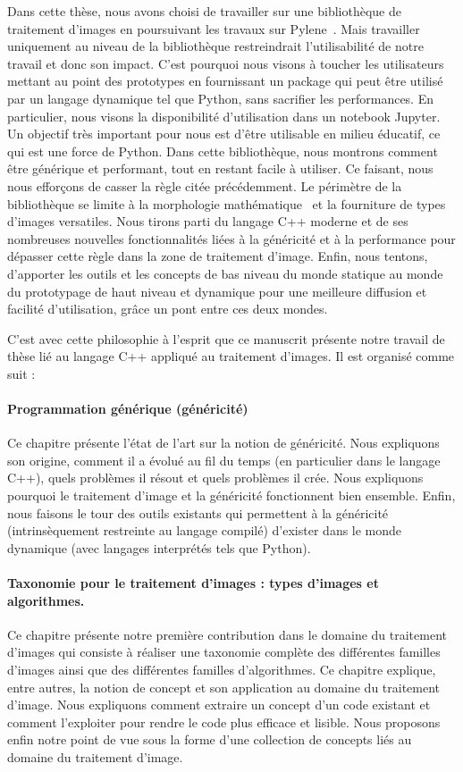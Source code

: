 Dans cette thèse, nous avons choisi de travailler sur une bibliothèque de traitement d'images en poursuivant les travaux
sur Pylene~\parencite{carlinet.2018.pylena}. Mais travailler uniquement au niveau de la bibliothèque restreindrait
l'utilisabilité de notre travail et donc son impact. C'est pourquoi nous visons à toucher les utilisateurs mettant au
point des prototypes en fournissant un package qui peut être utilisé par un langage dynamique tel que Python, sans
sacrifier les performances. En particulier, nous visons la disponibilité d'utilisation dans un notebook Jupyter. Un
objectif très important pour nous est d'être utilisable en milieu éducatif, ce qui est une force de Python. Dans cette
bibliothèque, nous montrons comment être générique et performant, tout en restant facile à utiliser. Ce faisant, nous
nous efforçons de casser la règle citée précédemment. Le périmètre de la bibliothèque se limite à la morphologie
mathématique~\parencite{najman.2013.mathematical,geraud.2010.book} et la fourniture de types d'images versatiles. Nous
tirons parti du langage C++ moderne et de ses nombreuses nouvelles fonctionnalités liées à la généricité et à la
performance pour dépasser cette règle dans la zone de traitement d'image. Enfin, nous tentons, d'apporter les outils et
les concepts de bas niveau du monde statique au monde du prototypage de haut niveau et dynamique pour une meilleure
diffusion et facilité d'utilisation, grâce un pont entre ces deux mondes.

C'est avec cette philosophie à l'esprit que ce manuscrit présente notre travail de thèse lié au langage C++ appliqué au
traitement d'images. Il est organisé comme suit :

\paragraph{Programmation générique (généricité)} Ce chapitre présente l'état de l'art sur la notion de généricité. Nous
expliquons son origine, comment il a évolué au fil du temps (en particulier dans le langage C++), quels problèmes il
résout et quels problèmes il crée. Nous expliquons pourquoi le traitement d'image et la généricité fonctionnent bien
ensemble. Enfin, nous faisons le tour des outils existants qui permettent à la généricité (intrinsèquement restreinte au
langage compilé) d'exister dans le monde dynamique (avec langages interprétés tels que Python).

\paragraph{Taxonomie pour le traitement d'images : types d'images et algorithmes.} Ce chapitre présente notre première
contribution dans le domaine du traitement d'images qui consiste à réaliser une taxonomie complète des différentes
familles d'images ainsi que des différentes familles d'algorithmes. Ce chapitre explique, entre autres, la notion de
concept et son application au domaine du traitement d'image. Nous expliquons comment extraire un concept d'un code
existant et comment l'exploiter pour rendre le code plus efficace et lisible. Nous proposons enfin notre point de vue
sous la forme d'une collection de concepts liés au domaine du traitement d'image.

